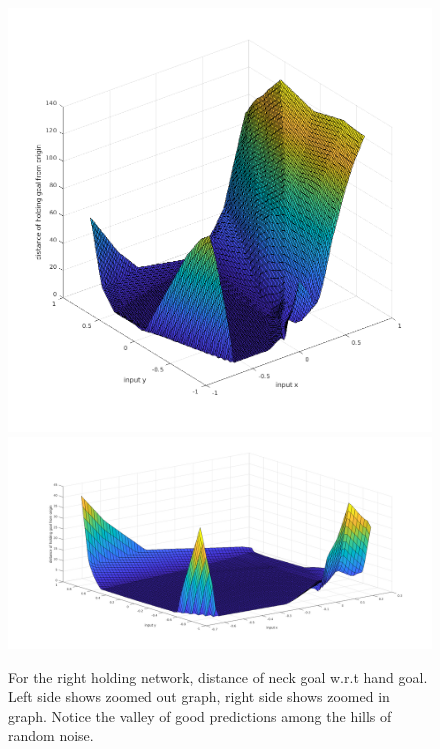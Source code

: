\documentclass[12pt]{article}
\begin{document}
\begin{figure}[!htb]
\includegraphics[width=\linewidth]{figures/right/zoomed_out.png}
\endminipage\hfill
{}
\includegraphics[width=\linewidth]{figures/right/zoomed_in.png}
\endminipage\hfill
\caption{For the right holding network, distance of neck goal w.r.t hand goal. Left side shows zoomed out graph, right side shows zoomed in graph. Notice the valley of good predictions among the hills of random noise.}
\label{fig:rm}
\end{figure}
\end{document}
